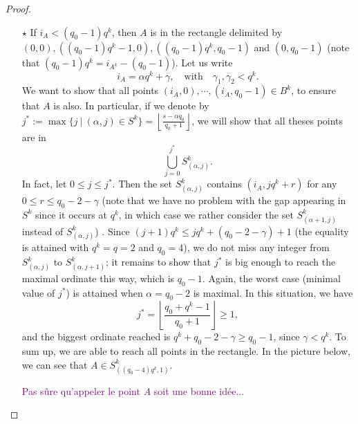 \documentclass[a4paper]{article}
\newcommand\jade[1]{\textcolor{purple}{#1}}
\begin{document}
\begin{proof}
\begin{itemize}
    \item[$\star$] If $i_A < (q_0-1)q^k$, then $A$ is in the rectangle delimited by $(0,0), ((q_0-1)q^k-1,0), ((q_0-1)q^k,q_0-1)$ and $(0,q_0-1)$ (note that $(q_0-1)q^k=i_{A^k}-(q_0-1)$). Let us write
    \[i_A = \alpha q^k+\gamma, \quad \mathrm{with} \quad \gamma_1,\gamma_2 < q^k.\]
    We want to show that all points $(i_A,0),\cdots,(i_A,q_0-1) \in B^k$, to ensure that $A$ is also. In particular, if we denote by $j^*:=\max \{j \ | \ (\alpha,j) \in S^k\} = \left\lfloor \frac{s-\alpha q_0}{q_0+1}\right\rfloor$, we will show that all theses points are in 
    \[\bigcup_{j=0}^{j^*} S^k_{(\alpha,j)}.\]
    In fact, let $0 \leq j \leq j^*$. Then the set $ S^k_{(\alpha,j)}$ contains $(i_A,jq^k+r)$ for any $0 \leq r \leq q_0-2-\gamma$ (note that we have no problem with the gap appearing in $S^k$ since it occurs at $q^k$, in which case we rather consider the set  $ S^k_{(\alpha+1,j)}$ instead of  $ S^k_{(\alpha,j)}$) . Since $(j+1)q^k \leq jq^k + (q_0-2-\gamma)+1$ (the equality is attained with $q^k=q=2$ and $q_0=4$), we do not miss any integer from $S^k_{(\alpha,j)}$ to $S^k_{(\alpha,j+1)}$; it remains to show that $j^*$ is big enough to reach the maximal ordinate this way, which is $q_0-1$. Again, the worst case (minimal value of $j^*$) is attained when $\alpha = q_0-2$ is maximal. In this situation, we have 
    \[j^* = \left\lfloor \dfrac{q_0+q^k-1}{q_0+1}\right\rfloor \geq 1,\]
    and the biggest ordinate reached is $q^k+q_0-2-\gamma \geq q_0-1$, since $\gamma < q^k$. To sum up, we are able to reach all points in the rectangle. In the picture below, we can see that $A \in S^k_{((q_0-4)q^k,1)}$. 

\jade{Pas sûre qu'appeler le point $A$ soit une bonne idée...}

\begin{figure}[h]
\begin{center}
\end{center}
\end{figure}
\end{itemize}
\end{proof}
\end{document}
